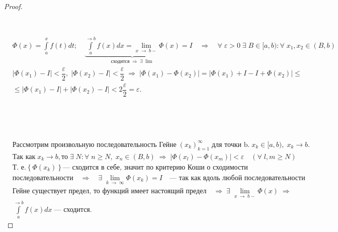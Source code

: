 \documentclass[../main.tex]{subfiles}
\begin{document}
\begin{proof}

    ~

    \boxed{\Rightarrow} 

    ~
    
    \(
    \begin{aligned}
        &\Phi(x) = \displaystyle\int\limits_{ a}^{ x} f(t)dt;\quad \underbrace{ \displaystyle\int\limits_{ a}^{ \rightarrow b} f(x)dx = \lim\limits_{ x \; \rightarrow \; b-} \Phi(x)}_{\text{сходится} \; \Rightarrow \; \exists \; \lim } = I \quad\Rightarrow\quad \forall \; \varepsilon> 0 \; \exists \; B \in [a, b): \forall \; x_1, x_2 \in (B, b) \\[5pt] 
        &\left| \Phi(x_1) - I\right| < \dfrac{ \varepsilon}{ 2}, \; \left| \Phi(x_2) - I\right| < \dfrac{ \varepsilon}{ 2} \;\Rightarrow\; \left| \Phi(x_1) - \Phi(x_2)\right| = \left| \Phi(x_1) + I - I + \Phi(x_2)\right| \leq \\[5pt] 
        &\leq \left| \Phi(x_1) - I\right| + \left| \Phi(x_2) - I\right| < 2 \dfrac{ \varepsilon}{ 2} = \varepsilon.
    \end{aligned}
    \)

    ~

    \boxed{\Leftarrow}

    ~

    \( 
    \begin{aligned}
        &\text{Рассмотрим произвольную последовательность Гейне}\; (x_k)_{k = 1}^\infty \; \text{для точки b.}\; x_k \in [a, b), \; x_k \rightarrow  b. \\[5pt]
        &\text{Так как} \; x_k \rightarrow b, \text{то} \; \exists \; N: \forall \; n \geq  N, \; x_n \in (B, b) \; \Rightarrow \; \left| \Phi(x_l) - \Phi(x_m)\right| < \varepsilon \quad ( \forall \; l, m \geq N ) \\[5pt]
        &\text{Т. е.} \left\{ \Phi(x_k)\right\}  \text{--- сходится в себе, значит по критерию Коши о сходимости} \\[5 pt] 
        &\text{последовательности}\quad \Rightarrow\quad \exists \; \lim\limits_{ k \; \rightarrow \; \infty} \Phi(x_k) = I\quad \text{--- так как вдоль любой последовательности} \\[5pt] 
        &\text{Гейне существует предел, то функций имеет настоящий предел}\quad \Longrightarrow \; \exists \; \lim\limits_{ x \; \rightarrow \; b-} \Phi(x) \; \Rightarrow \\
        &\displaystyle\int\limits_{ a}^{ \rightarrow b} f(x)dx \; \text{--- сходится}. 
     \end{aligned}
    \)
\end{proof}
\end{document}
